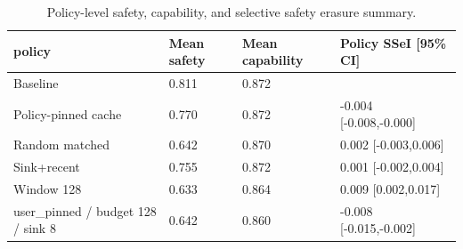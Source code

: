 \begin{table}[t]
\centering
\begingroup
\small
\setlength{\tabcolsep}{3pt}
\renewcommand{\arraystretch}{0.94}
\begin{tabularx}{\linewidth}{@{}lXXX@{}}
\toprule
policy & Mean safety & Mean capability & Policy SSeI [95\% CI] \\
\midrule
Baseline & 0.811 & 0.872 &  \\
Policy-pinned cache & 0.770 & 0.872 & -0.004 [-0.008,-0.000] \\
Random matched & 0.642 & 0.870 & 0.002 [-0.003,0.006] \\
Sink+recent & 0.755 & 0.872 & 0.001 [-0.002,0.004] \\
Window 128 & 0.633 & 0.864 & 0.009 [0.002,0.017] \\
user\_pinned / budget 128 / sink 8 & 0.642 & 0.860 & -0.008 [-0.015,-0.002] \\
\bottomrule
\end{tabularx}
\endgroup
\caption{Policy-level safety, capability, and selective safety erasure summary.}
\label{tab:main-results}
\end{table}
